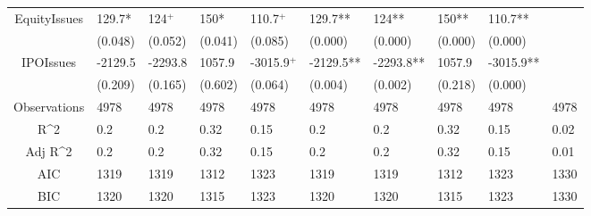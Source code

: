 \documentclass{article}
\begin{document}
\begin{table}[H]
\begin{tabular}{|clllllllll|}
  EquityIssues & 129.7* & 124$^{+}$ & 150* & 110.7$^{+}$ & 129.7** & 124** & 150** & 110.7** &  \\ 
   & (0.048) & (0.052) & (0.041) & (0.085) & (0.000) & (0.000) & (0.000) & (0.000) &  \\ 
  IPOIssues & -2129.5 & -2293.8 & 1057.9 & -3015.9$^{+}$ & -2129.5** & -2293.8** & 1057.9 & -3015.9** &  \\ 
   & (0.209) & (0.165) & (0.602) & (0.064) & (0.004) & (0.002) & (0.218) & (0.000) &  \\ 
  \hline 
 Observations & 4978 & 4978 & 4978 & 4978 & 4978 & 4978 & 4978 & 4978 & 4978 \\ 
  R^2 & 0.2 & 0.2 & 0.32 & 0.15 & 0.2 & 0.2 & 0.32 & 0.15 & 0.02 \\ 
  Adj R^2 & 0.2 & 0.2 & 0.32 & 0.15 & 0.2 & 0.2 & 0.32 & 0.15 & 0.01 \\ 
  AIC & 1319 & 1319 & 1312 & 1323 & 1319 & 1319 & 1312 & 1323 & 1330 \\ 
  BIC & 1320 & 1320 & 1315 & 1323 & 1320 & 1320 & 1315 & 1323 & 1330 \\ 
   \hline
\end{tabular}
 
\end{table}
\end{document}

